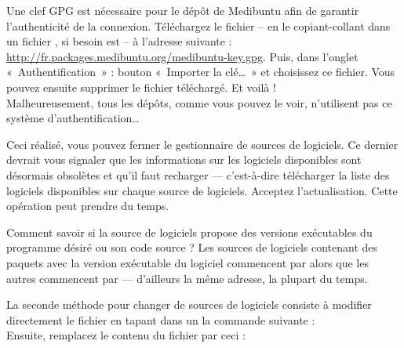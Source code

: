 Une clef GPG est nécessaire pour le dépôt de Medibuntu afin de garantir l'authenticité de la connexion. Téléchargez le fichier  -- en le copiant-collant dans un fichier , si besoin est -- à l'adresse suivante : \url{http://fr.packages.medibuntu.org/medibuntu-key.gpg}. Puis, dans l'onglet «~Authentification~» : bouton «~Importer la clé\ldots{}~» et choisissez ce fichier. Vous pouvez ensuite supprimer le fichier téléchargé. Et voilà !\\
Malheureusement, tous les dépôts, comme vous pouvez le voir, n'utilisent pas ce système d'authentification\ldots{}\par
Ceci réalisé, vous pouvez fermer le gestionnaire de sources de logiciels. Ce dernier devrait vous signaler que les informations sur les logiciels disponibles sont désormais obsolètes et qu'il faut recharger --- c'est-à-dire télécharger la liste des logiciels disponibles sur chaque source de logiciels. Acceptez l'actualisation. Cette opération peut prendre du temps.\par
\begin{nota}
Comment savoir si la source de logiciels propose des versions exécutables du programme désiré ou son code source ? Les sources de logiciels contenant des paquets avec la version exécutable du logiciel commencent par  alors que les autres commencent par  --- d'ailleurs la même adresse, la plupart du temps.
\end{nota}
La seconde méthode pour changer de sources de logiciels consiste à modifier directement le fichier  en tapant dans un  la commande suivante : \\
Ensuite, remplacez le contenu du fichier par ceci :\\
